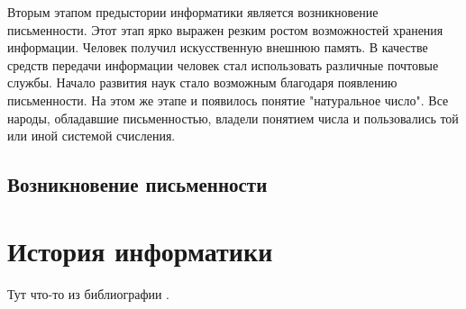Вторым этапом предыстории информатики является возникновение письменности. Этот этап ярко выражен резким ростом возможностей хранения информации.  Человек получил искусственную внешнюю память. В качестве средств передачи информации человек стал использовать различные почтовые службы. Начало развития наук стало возможным благодаря появлению письменности. На этом же этапе и появилось понятие "натуральное число". Все народы, обладавшие письменностью, владели понятием числа и пользовались той или иной системой счисления.

\subsection{Возникновение письменности} \label{subsect1_1_3}




\section{История информатики} \label{sect1_2}

Тут что-то из библиографии \cite{bib102}. 




\clearpage
